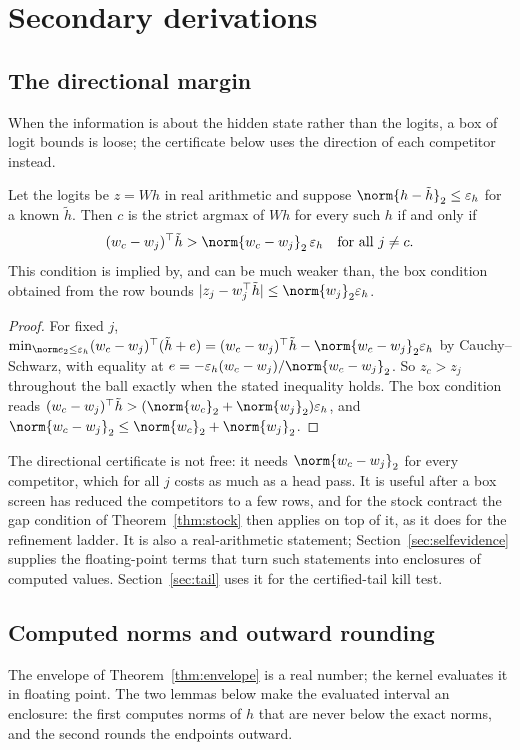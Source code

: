 \section{Secondary derivations}\label{app:derivations}
\subsection{The directional margin}\label{app:directional}
When the information is about the hidden state rather than the logits, a box of logit bounds is loose; the certificate below uses the direction of each competitor instead.
\begin{proposition}\label{prop:directional}
Let the logits be $z=Wh$ in real arithmetic and suppose $\norm{h-\tilde h}_2\le\varepsilon_h$ for a known $\tilde h$. Then $c$ is the strict argmax of $Wh$ for every such $h$ if and only if
\[(w_c-w_j)^\top\tilde h>\norm{w_c-w_j}_2\,\varepsilon_h\quad\text{for all }j\neq c.\]
This condition is implied by, and can be much weaker than, the box condition obtained from the row bounds $|z_j-w_j^\top\tilde h|\le\norm{w_j}_2\varepsilon_h$.
\end{proposition}
\begin{proof}
For fixed $j$, $\min_{\norm e_2\le\varepsilon_h}(w_c-w_j)^\top(\tilde h+e)=(w_c-w_j)^\top\tilde h-\norm{w_c-w_j}_2\varepsilon_h$ by Cauchy--Schwarz, with equality at $e=-\varepsilon_h(w_c-w_j)/\norm{w_c-w_j}_2$. So $z_c>z_j$ throughout the ball exactly when the stated inequality holds. The box condition reads $(w_c-w_j)^\top\tilde h>(\norm{w_c}_2+\norm{w_j}_2)\varepsilon_h$, and $\norm{w_c-w_j}_2\le\norm{w_c}_2+\norm{w_j}_2$.
\end{proof}
The directional certificate is not free: it needs $\norm{w_c-w_j}_2$ for every competitor, which for all $j$ costs as much as a head pass. It is useful after a box screen has reduced the competitors to a few rows, and for the stock contract the gap condition of Theorem~\ref{thm:stock} then applies on top of it, as it does for the refinement ladder. It is also a real-arithmetic statement; Section~\ref{sec:selfevidence} supplies the floating-point terms that turn such statements into enclosures of computed values. Section~\ref{sec:tail} uses it for the certified-tail kill test.


\subsection{Computed norms and outward rounding}\label{app:outward}
The envelope of Theorem~\ref{thm:envelope} is a real number; the kernel evaluates it in floating point. The two lemmas below make the evaluated interval an enclosure: the first computes norms of $h$ that are never below the exact norms, and the second rounds the endpoints outward.

